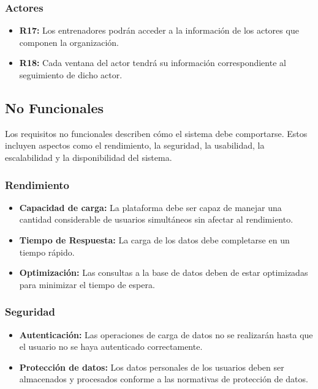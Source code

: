 \subsubsection{Actores}
\begin{itemize}
    \item \textbf{R17:} Los entrenadores podrán acceder a la información de los actores que componen la organización.
    
    \item \textbf{R18:} Cada ventana del actor tendrá su información correspondiente al seguimiento de dicho actor.
    
\end{itemize}

\subsection{No Funcionales}
Los requisitos no funcionales describen cómo el sistema debe comportarse. Estos incluyen aspectos como el rendimiento, la seguridad, la usabilidad, la escalabilidad y la disponibilidad del sistema.

\subsubsection{Rendimiento}
\begin{itemize}
    \item \textbf{Capacidad de carga:} La plataforma debe ser capaz de manejar una cantidad considerable de usuarios simultáneos sin afectar al rendimiento.
    
    \item \textbf{Tiempo de Respuesta:} La carga de los datos debe completarse en un tiempo rápido.
    
    \item \textbf{Optimización:} Las consultas a la base de datos deben de estar optimizadas para minimizar el tiempo de espera.
    
\end{itemize}

\subsubsection{Seguridad}
\begin{itemize}
    \item \textbf{Autenticación:} Las operaciones de carga de datos no se realizarán hasta que el usuario no se haya autenticado correctamente.
    
    \item \textbf{Protección de datos:} Los datos personales de los usuarios deben ser almacenados y procesados conforme a las normativas de protección de datos.
    
\end{itemize}

